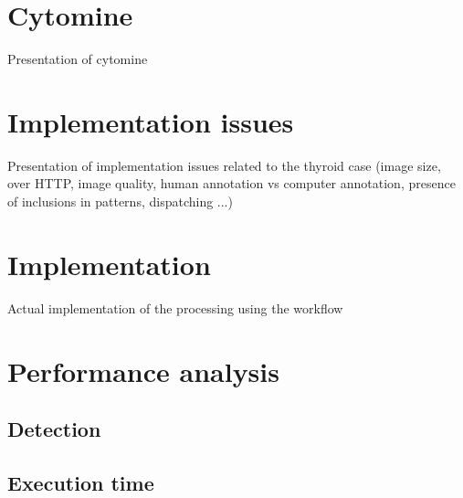 \section{Cytomine}
Presentation of cytomine 
\section{Implementation issues}
Presentation of implementation issues related to the thyroid case (image size, over HTTP, image quality, human annotation vs computer annotation, presence of inclusions in patterns, dispatching ...)
\section{Implementation}
Actual implementation of the processing using the workflow
\section{Performance analysis}
\subsection{Detection}
\subsection{Execution time}